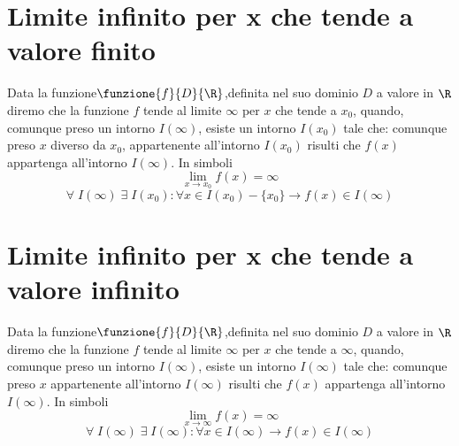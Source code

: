 \section{Limite infinito per x che tende a valore finito}
Data la funzione$\funzione{f}{D}{\R}$,definita nel suo dominio $D$ a valore in $\R$  diremo che la funzione $f$ tende al limite $\infty$ per $x$ che tende a $x_0$, quando, comunque preso un intorno $I(\infty)$, esiste un intorno $I(x_0)$ tale che: comunque preso $x$ diverso da $x_0$, appartenente  all'intorno $I(x_0)$ risulti che $f(x)$ appartenga all'intorno $I(\infty)$. In simboli
\begin{equation*}
\lim_{x\to x_0}f(x)=\infty
\end{equation*}
\begin{equation*}
\forall\; I(\infty)\; \exists\; I(x_0) : \forall x\in I(x_0)-\lbrace x_0\rbrace \longrightarrow f(x)\in I(\infty)
\end{equation*}
\section{Limite infinito per x che tende a valore infinito}
Data la funzione$\funzione{f}{D}{\R}$,definita nel suo dominio $D$ a valore in $\R$  diremo che la funzione $f$ tende al limite $\infty$ per $x$ che tende a $\infty$, quando, comunque preso un intorno $I(\infty)$, esiste un intorno $I(\infty)$ tale che: comunque preso $x$ appartenente  all'intorno $I(\infty)$ risulti che $f(x)$ appartenga all'intorno $I(\infty)$. In simboli
\begin{equation*}
\lim_{x\to \infty}f(x)=\infty
\end{equation*}
\begin{equation*}
\forall\; I(\infty)\; \exists\; I(\infty) : \forall x\in I(\infty) \longrightarrow f(x)\in I(\infty)
\end{equation*}
